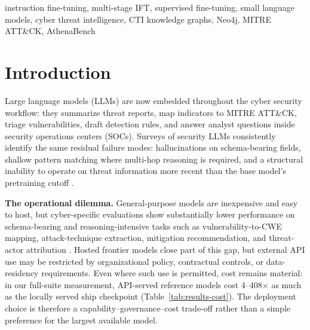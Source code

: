 \documentclass[conference]{IEEEtran}
\begin{document}
\begin{IEEEkeywords}
instruction fine-tuning, multi-stage IFT, supervised fine-tuning, small language models, cyber threat intelligence, CTI knowledge graphs, Neo4j, MITRE ATT\&CK, AthenaBench
\end{IEEEkeywords}

\section{Introduction}

Large language models (LLMs) are now embedded throughout the cyber security workflow: they summarize threat reports, map indicators to MITRE ATT\&CK, triage vulnerabilities, draft detection rules, and answer analyst questions inside security operations centers (SOCs). Surveys of security LLMs consistently identify the same residual failure modes: hallucinations on schema-bearing fields, shallow pattern matching where multi-hop reasoning is required, and a structural inability to operate on threat information more recent than the base model's pretraining cutoff \cite{levi2024cyberpal,liu2024cyberbench}.

\textbf{The operational dilemma.} General-purpose models are inexpensive and easy to host, but cyber-specific evaluations show substantially lower performance on schema-bearing and reasoning-intensive tasks such as vulnerability-to-CWE mapping, attack-technique extraction, mitigation recommendation, and threat-actor attribution \cite{alam2024ctibench,alam2025athenabench,liu2024cyberbench}. Hosted frontier models close part of this gap, but external API use may be restricted by organizational policy, contractual controls, or data-residency requirements. Even where such use is permitted, cost remains material: in our full-suite measurement, API-served reference models cost 4--408$\times$ as much as the locally served ship checkpoint (Table~\ref{tab:results-cost}). The deployment choice is therefore a capability--governance--cost trade-off rather than a simple preference for the largest available model.
\end{document}
